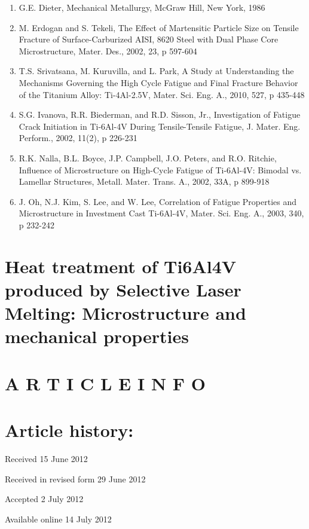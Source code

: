 \documentclass[10pt]{article}
\begin{document}
\begin{enumerate}
  \item G.E. Dieter, Mechanical Metallurgy, McGraw Hill, New York, 1986

  \item M. Erdogan and S. Tekeli, The Effect of Martensitic Particle Size on Tensile Fracture of Surface-Carburized AISI, 8620 Steel with Dual Phase Core Microstructure, Mater. Des., 2002, 23, p 597-604

  \item T.S. Srivatsana, M. Kuruvilla, and L. Park, A Study at Understanding the Mechanisms Governing the High Cycle Fatigue and Final Fracture Behavior of the Titanium Alloy: Ti-4Al-2.5V, Mater. Sci. Eng. A., 2010, 527, p 435-448

  \item S.G. Ivanova, R.R. Biederman, and R.D. Sisson, Jr., Investigation of Fatigue Crack Initiation in Ti-6Al-4V During Tensile-Tensile Fatigue, J. Mater. Eng. Perform., 2002, 11(2), p 226-231

  \item R.K. Nalla, B.L. Boyce, J.P. Campbell, J.O. Peters, and R.O. Ritchie, Influence of Microstructure on High-Cycle Fatigue of Ti-6Al-4V: Bimodal vs. Lamellar Structures, Metall. Mater. Trans. A., 2002, 33A, p 899-918

  \item J. Oh, N.J. Kim, S. Lee, and W. Lee, Correlation of Fatigue Properties and Microstructure in Investment Cast Ti-6Al-4V, Mater. Sci. Eng. A., 2003, 340, p 232-242

\end{enumerate}

\section*{Heat treatment of Ti6Al4V produced by Selective Laser Melting: Microstructure and mechanical properties }


\section*{A R T I C L E I N F O}
\section*{Article history:}
Received 15 June 2012

Received in revised form 29 June 2012

Accepted 2 July 2012

Available online 14 July 2012
\end{document}
